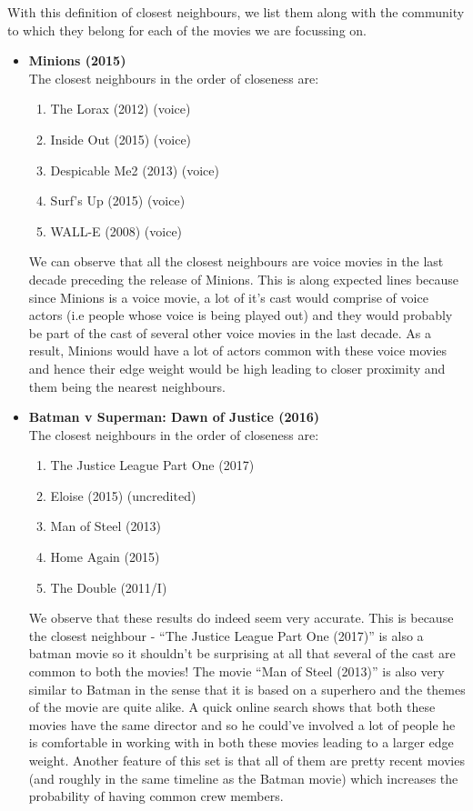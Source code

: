 \documentclass{article}
\begin{document}
With this definition of closest neighbours, we list them along with the community to which they belong for each
of the movies we are focussing on.
\begin{itemize}
 \item \textbf{Minions (2015)}\\
 The closest neighbours in the order of closeness are:
 \begin{enumerate}
  \item
  The Lorax (2012) (voice)
  \item
  Inside Out (2015) (voice)
  \item
  Despicable Me2 (2013) (voice)
  \item
  Surf's Up (2015) (voice)
  \item
  WALL-E (2008) (voice) 
 \end{enumerate}
We can observe that all the closest neighbours are voice movies in the last decade preceding the release of Minions.
This is along expected lines because since Minions is a voice movie, a lot of it's cast would comprise of voice actors 
(i.e people whose voice is being played out) and they would probably be part of the cast of several other voice movies in the
last decade. As a result, Minions would have a lot of actors common with these voice movies and hence their edge weight would be 
high leading to closer proximity and them being the nearest neighbours.

\item \textbf{Batman v Superman: Dawn of Justice (2016)}\\
 The closest neighbours in the order of closeness are:
 \begin{enumerate}
 \item
 The Justice League Part One (2017)
  \item
  Eloise (2015) (uncredited)
  \item
 Man of Steel (2013)
 \item
 Home Again (2015)
 \item
 The Double (2011/I) 
 \end{enumerate}
We observe that these results do indeed seem very accurate. This is because the closest neighbour - ``The Justice League Part One (2017)''
is also a batman movie so it shouldn't be surprising at all that several of the cast are common to both the movies!
The movie ``Man of Steel (2013)'' is also very similar to Batman in the sense that it is based on a superhero and the themes
of the movie are quite alike. A quick online search shows that both these movies have the same director and so he could've
involved a lot of people he is comfortable in working with in both these movies leading to a larger edge weight. Another
feature of this set is that all of them are pretty recent movies (and roughly in the same timeline as the Batman movie) which 
increases the probability of having common crew members.


\end{itemize}
\end{document}
